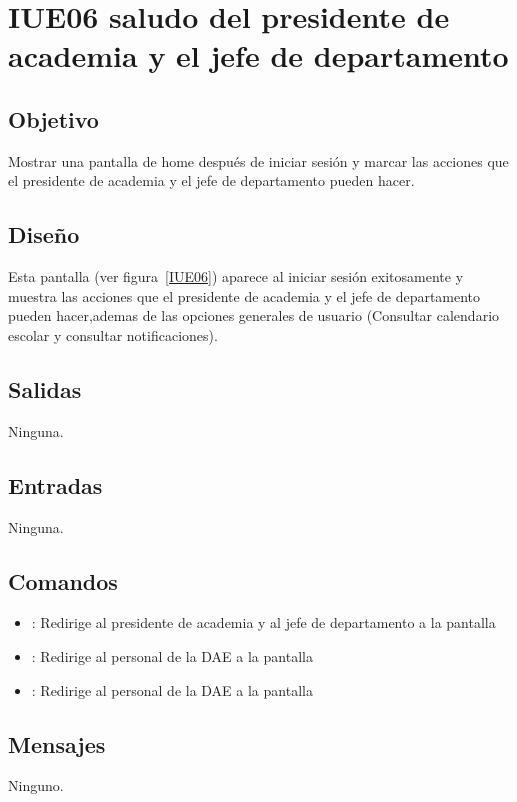 \section{IUE06 saludo del presidente de academia y el jefe de departamento}

\subsection{Objetivo}
Mostrar una pantalla de home después de iniciar sesión y marcar las acciones que el presidente de academia y el jefe de departamento pueden hacer.

\subsection{Diseño}
Esta pantalla  (ver figura~\ref{IUE06}) aparece al iniciar sesión exitosamente y muestra las acciones que el presidente de academia y el jefe de departamento pueden hacer,ademas de las opciones generales de usuario (Consultar calendario escolar y consultar notificaciones). 


\subsection{Salidas}
 
Ninguna.

\subsection{Entradas}
Ninguna.

\subsection{Comandos}
\begin{itemize}
	\item {}: Redirige al presidente de academia y al jefe de departamento a la pantalla 
	\item {}: Redirige al personal de la DAE a la pantalla 
	\item {}: Redirige al personal de la DAE a la pantalla 
	
\end{itemize}

\subsection{Mensajes}

\begin{Citemize}
	\item Ninguno.
\end{Citemize}